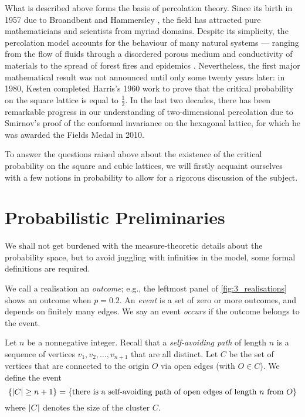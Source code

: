 \documentclass[a4paper, 12pt]{article}
\begin{document}
What is described above forms the basis of percolation theory. Since its birth in 1957 due to Broandbent and Hammersley \autocite*[693]{broadbent_hammersley_1957}, the field has attracted pure mathematicians and scientists from myriad domains. Despite its simplicity, the percolation model accounts for the behaviour of many natural systems --- ranging from the flow of fluids through a disordered porous medium and conductivity of materials to the spread of forest fires and epidemics \autocite[60]{gennes_2000}. Nevertheless, the first major mathematical result was not announced until only some twenty years later: in 1980, Kesten \autocite*[41]{kesten_1980} completed Harris's \autocite*[13]{harris_lindley_1960} 1960 work to prove that the critical probability on the square lattice is equal to $\frac{1}{2}$. In the last two decades, there has been remarkable progress in our understanding of two-dimensional percolation due to Smirnov's \autocite*[239]{smirnov_2001} proof of the conformal invariance on the hexagonal lattice, for which he was awarded the Fields Medal in 2010.

To answer the questions raised above about the existence of the critical probability on the square and cubic lattices, we will firstly acquaint ourselves with a few notions in probability to allow for a rigorous discussion of the subject.

\section{Probabilistic Preliminaries}\label{ch:prelims}
We shall not get burdened with the measure-theoretic details about the probability space, but to avoid juggling with infinities in the model, some formal definitions are required.

\begin{defn}\label{defn:outcome_and_event}
We call a realisation an \textit{outcome}; e.g., the leftmost panel of \cref{fig:3_realisations} shows an outcome when $p = 0.2$. An \textit{event} is a set of zero or more outcomes, and depends on finitely many edges. We say an event \textit{occurs} if the outcome belongs to the event.
\end{defn}

\begin{ex}\label{ex:cluster_of_size_n}
Let $n$ be a nonnegative integer. Recall that a \textit{self-avoiding path} of length $n$ is a sequence of vertices $v_1, v_2, \dots, v_{n + 1}$ that are all distinct.
Let $C$ be the set of vertices that are connected to the origin $O$ via open edges (with $O \in C$). We define the event
\[
\{\lvert C \rvert \geq n + 1\}
= \{\text{there is a self-avoiding path of open edges of length } n \text{ from } O\}
\]
where $\lvert C \rvert$ denotes the size of the cluster $C$.

\end{ex}
\end{document}
